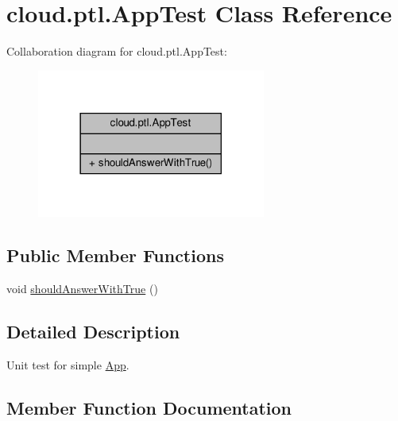 \hypertarget{classcloud_1_1ptl_1_1AppTest}{}\section{cloud.\+ptl.\+App\+Test Class Reference}
\label{classcloud_1_1ptl_1_1AppTest}


Collaboration diagram for cloud.\+ptl.\+App\+Test\+:
\nopagebreak
\begin{figure}[H]
\begin{center}
\leavevmode
\includegraphics[width=213pt]{classcloud_1_1ptl_1_1AppTest__coll__graph}
\end{center}
\end{figure}
\subsection*{Public Member Functions}
\begin{DoxyCompactItemize}
\item 
void \hyperlink{classcloud_1_1ptl_1_1AppTest_ad4615d98b5e2e065cc330ed6eb6a33c7}{should\+Answer\+With\+True} ()
\end{DoxyCompactItemize}


\subsection{Detailed Description}
Unit test for simple \hyperlink{classcloud_1_1ptl_1_1App}{App}. 

\subsection{Member Function Documentation}
\mbox{\label{classcloud_1_1ptl_1_1AppTest_ad4615d98b5e2e065cc330ed6eb6a33c7}} 
